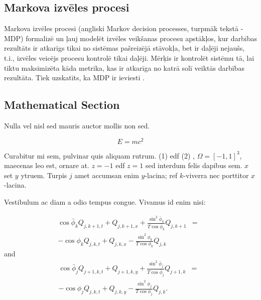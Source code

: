 \documentclass[a0,landscape]{a0poster}
\begin{document}
\begin{multicols}{4}

\section*{Markova izvēles procesi}

Markova izvēles procesi (angliski Markov decision processes, turpmāk tekstā - MDP) formalizē un ļauj modelēt izvēles veikšanas procesu apstākļos, kur darbības rezultāts ir atkarīgs tikai no sistēmas pašreizējā stāvokļa, bet ir daļēji nejaušs, t.i., izvēles veicējs procesu kontrolē tikai daļēji.
Mērķis ir kontrolēt sistēmu tā, lai tiktu maksimizēta kāda metrika, kas ir atkarīga no katrā solī veiktās darbības rezultāta.
Tiek uzskatīts, ka MDP ir ieviesti \autocite{Bel}.


\subsection*{Mathematical Section}

Nulla vel nisl sed mauris auctor mollis non sed. 

\begin{equation}
E = mc^{2}
\label{eqn:Einstein}
\end{equation}

Curabitur mi sem, pulvinar quis aliquam rutrum. (1) edf (2)
, $\Omega=[-1,1]^3$, maecenas leo est, ornare at. $z=-1$ edf $z=1$ sed interdum felis dapibus sem. $x$ set $y$ ytruem. 
Turpis $j$ amet accumsan enim $y$-lacina; 
ref $k$-viverra nec porttitor $x$-lacina. 

Vestibulum ac diam a odio tempus congue. Vivamus id enim nisi:

\begin{eqnarray}
\cos\bar{\phi}_k Q_{j,k+1,t} + Q_{j,k+1,x}+\frac{\sin^2\bar{\phi}_k}{T\cos\bar{\phi}_k} Q_{j,k+1} &=&\nonumber\\ 
-\cos\phi_k Q_{j,k,t} + Q_{j,k,x}-\frac{\sin^2\phi_k}{T\cos\phi_k} Q_{j,k}\label{edgek}
\end{eqnarray}
and
\begin{eqnarray}
\cos\bar{\phi}_j Q_{j+1,k,t} + Q_{j+1,k,y}+\frac{\sin^2\bar{\phi}_j}{T\cos\bar{\phi}_j} Q_{j+1,k}&=&\nonumber \\
-\cos\phi_j Q_{j,k,t} + Q_{j,k,y}-\frac{\sin^2\phi_j}{T\cos\phi_j} Q_{j,k}.\label{edgej}
\end{eqnarray} 


\end{multicols}
\end{document}
